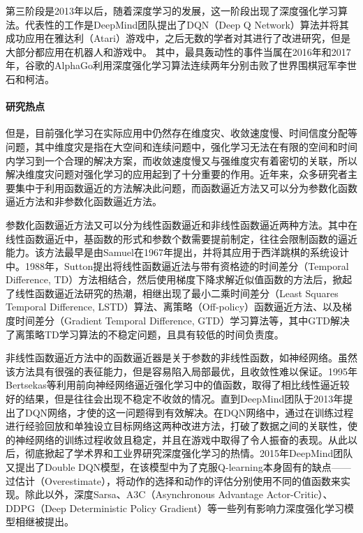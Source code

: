 第三阶段是2013年以后，随着深度学习的发展，这一阶段出现了深度强化学习算法。代表性的工作是DeepMind团队提出了DQN（Deep Q Network）算法并将其成功应用在雅达利（Atari）游戏中\citep{mnih2013playing}，之后无数的学者对其进行了改进研究，但是
大部分都应用在机器人和游戏中。
其中，最具轰动性的事件当属在2016年和2017年，谷歌的AlphaGo利用深度强化学习算法连续两年分别击败了世界围棋冠军李世石和柯洁。

\paragraph{研究热点}
但是，目前强化学习在实际应用中仍然存在维度灾、收敛速度慢、时间信度分配等问题，其中维度灾是指在大空间和连续问题中，强化学习无法在有限的空间和时间内学习到一个合理的解决方案，而收敛速度慢又与强维度灾有着密切的关联，所以解决维度灾问题对强化学习的应用起到了十分重要的作用。近年来，众多研究者主要集中于利用函数逼近的方法解决此问题，而函数逼近方法又可以分为参数化函数逼近方法和非参数化函数逼近方法。

参数化函数逼近方法又可以分为线性函数逼近和非线性函数逼近两种方法。其中在线性函数逼近中，基函数的形式和参数个数需要提前制定，往往会限制函数的逼近能力。该方法最早是由Samuel在1967年提出，并将其应用于西洋跳棋的系统设计中\citep{samuel1959some}。1988年，Sutton提出将线性函数逼近法与带有资格迹的时间差分（Temporal Difference, TD）方法相结合，然后使用梯度下降求解近似值函数的方法后\citep{sutton1988learning}，掀起了线性函数逼近法研究的热潮，相继出现了最小二乘时间差分（Least Squares Temporal Difference, LSTD）算法\citep{bradtke1996linear}、离策略（Off-policy）函数逼近方法\citep{precup2001off}、以及梯度时间差分（Gradient Temporal Difference, GTD）学习算法\citep{sutton2009convergent}等，其中GTD解决了离策略TD学习算法的不稳定问题，且具有较低的时间负责度\citep{sutton2009convergent}。

非线性函数逼近方法中的函数逼近器是关于参数的非线性函数，如神经网络。虽然该方法具有很强的表征能力，但是容易陷入局部最优，且收敛性难以保证。1995年Bertsekas等\citep{bertsekas1995neuro}利用前向神经网络逼近强化学习中的值函数，取得了相比线性逼近较好的结果，但是往往会出现不稳定不收敛的情况。直到DeepMind团队于2013年提出了DQN网络，才使的这一问题得到有效解决。在DQN网络中，通过在训练过程进行经验回放\citep{mnih2013playing}和单独设立目标网络\citep{mnih2015human}这两种改进方法，打破了数据之间的关联性，使的神经网络的训练过程收敛且稳定，并且在游戏中取得了令人振奋的表现。从此以后，彻底掀起了学术界和工业界研究深度强化学习的热情。2015年DeepMind团队又提出了Double DQN模型，在该模型中为了克服Q-learning本身固有的缺点——过估计（Overestimate），将动作的选择和动作的评估分别使用不同的值函数来实现。除此以外，深度Sarsa、A3C（Asynchronous Advantage Actor-Critic）、DDPG（Deep Deterministic Policy Gradient）等一些列有影响力深度强化学习模型相继被提出。

